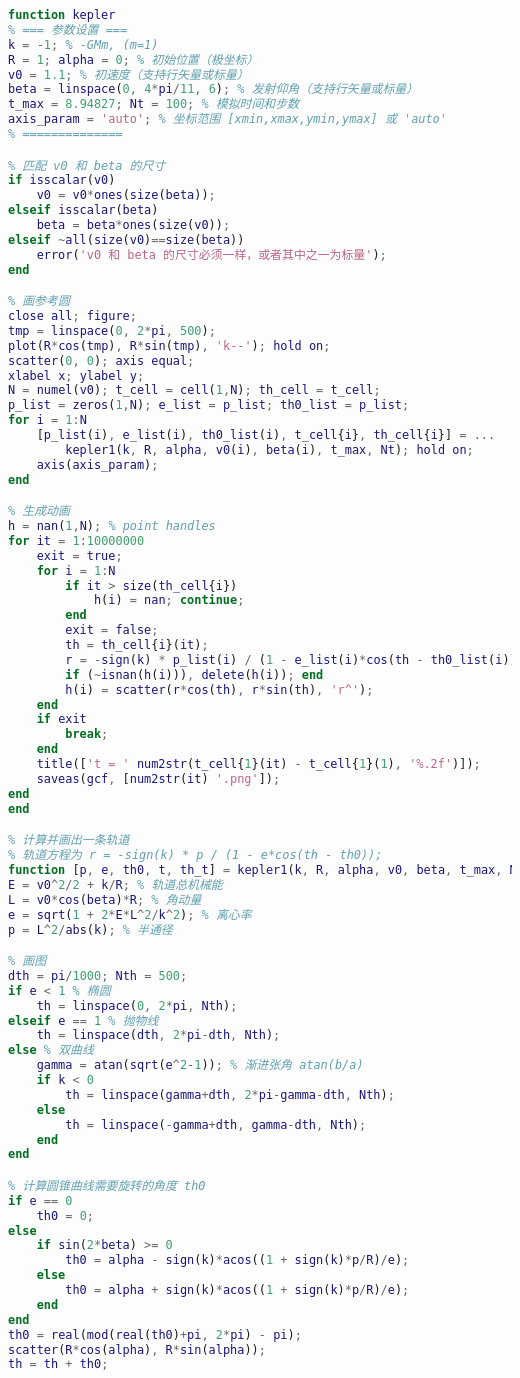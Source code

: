 \begin{lstlisting}[language=matlab,caption=kepler.m]
% 已知初始位置、发射速度、发射方向， 求轨道以及运动方程
function kepler
% === 参数设置 ===
k = -1; % -GMm, (m=1)
R = 1; alpha = 0; % 初始位置（极坐标）
v0 = 1.1; % 初速度（支持行矢量或标量）
beta = linspace(0, 4*pi/11, 6); % 发射仰角（支持行矢量或标量）
t_max = 8.94827; Nt = 100; % 模拟时间和步数
axis_param = 'auto'; % 坐标范围 [xmin,xmax,ymin,ymax] 或 'auto'
% ==============

% 匹配 v0 和 beta 的尺寸
if isscalar(v0)
    v0 = v0*ones(size(beta));
elseif isscalar(beta)
    beta = beta*ones(size(v0));
elseif ~all(size(v0)==size(beta))
    error('v0 和 beta 的尺寸必须一样，或者其中之一为标量');
end

% 画参考圆
close all; figure;
tmp = linspace(0, 2*pi, 500);
plot(R*cos(tmp), R*sin(tmp), 'k--'); hold on;
scatter(0, 0); axis equal;
xlabel x; ylabel y;
N = numel(v0); t_cell = cell(1,N); th_cell = t_cell;
p_list = zeros(1,N); e_list = p_list; th0_list = p_list;
for i = 1:N
    [p_list(i), e_list(i), th0_list(i), t_cell{i}, th_cell{i}] = ...
        kepler1(k, R, alpha, v0(i), beta(i), t_max, Nt); hold on;
    axis(axis_param);
end

% 生成动画
h = nan(1,N); % point handles
for it = 1:10000000
    exit = true;
    for i = 1:N
        if it > size(th_cell{i})
            h(i) = nan; continue;
        end
        exit = false;
        th = th_cell{i}(it);
        r = -sign(k) * p_list(i) / (1 - e_list(i)*cos(th - th0_list(i)));
        if (~isnan(h(i))), delete(h(i)); end
        h(i) = scatter(r*cos(th), r*sin(th), 'r^');
    end
    if exit
        break;
    end
    title(['t = ' num2str(t_cell{1}(it) - t_cell{1}(1), '%.2f')]);
    saveas(gcf, [num2str(it) '.png']);
end
end

% 计算并画出一条轨道
% 轨道方程为 r = -sign(k) * p / (1 - e*cos(th - th0));
function [p, e, th0, t, th_t] = kepler1(k, R, alpha, v0, beta, t_max, Nt)
E = v0^2/2 + k/R; % 轨道总机械能
L = v0*cos(beta)*R; % 角动量
e = sqrt(1 + 2*E*L^2/k^2); % 离心率
p = L^2/abs(k); % 半通径

% 画图
dth = pi/1000; Nth = 500;
if e < 1 % 椭圆
    th = linspace(0, 2*pi, Nth);
elseif e == 1 % 抛物线
    th = linspace(dth, 2*pi-dth, Nth);
else % 双曲线
    gamma = atan(sqrt(e^2-1)); % 渐进张角 atan(b/a)
    if k < 0
        th = linspace(gamma+dth, 2*pi-gamma-dth, Nth);
    else
        th = linspace(-gamma+dth, gamma-dth, Nth);
    end
end

% 计算圆锥曲线需要旋转的角度 th0
if e == 0
    th0 = 0;
else
    if sin(2*beta) >= 0
        th0 = alpha - sign(k)*acos((1 + sign(k)*p/R)/e);
    else
        th0 = alpha + sign(k)*acos((1 + sign(k)*p/R)/e);
    end
end
th0 = real(mod(real(th0)+pi, 2*pi) - pi);
scatter(R*cos(alpha), R*sin(alpha));
th = th + th0;


\end{lstlisting}

